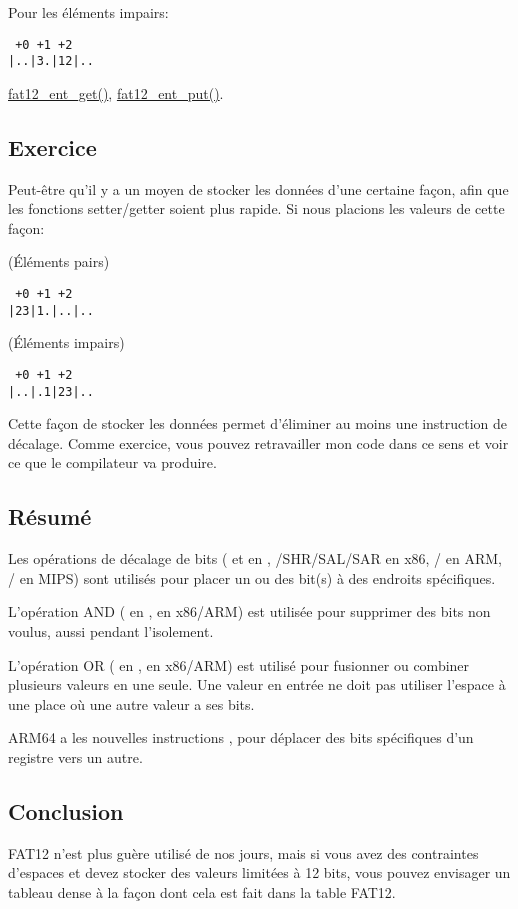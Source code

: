 Pour les éléments impairs:

\begin{lstlisting}
 +0 +1 +2
|..|3.|12|..
\end{lstlisting}

\href{https://github.com/torvalds/linux/blob/de182468d1bb726198abaab315820542425270b7/fs/fat/fatent.c#L117}{fat12\_ent\_get()},
\href{https://github.com/torvalds/linux/blob/de182468d1bb726198abaab315820542425270b7/fs/fat/fatent.c#L153}{fat12\_ent\_put()}.


\subsection{Exercice}

Peut-être qu'il y a un moyen de stocker les données d'une certaine façon, afin que
les fonctions setter/getter soient plus rapide.
Si nous placions les valeurs de cette façon:

(Éléments pairs)

\begin{lstlisting}
 +0 +1 +2
|23|1.|..|..
\end{lstlisting}

(Éléments impairs)

\begin{lstlisting}
 +0 +1 +2
|..|.1|23|..
\end{lstlisting}

Cette façon de stocker les données permet d'éliminer au moins une instruction de
décalage.
Comme exercice, vous pouvez retravailler mon code \CCpp dans ce sens et voir ce que
le compilateur va produire.

\subsection{Résumé}

Les opérations de décalage de bits (\TT{<<} et \TT{>>} en \CCpp, /{SHR}/{SAL}/{SAR}
en x86, / en ARM, / en MIPS) sont utilisés pour
placer un ou des bit(s) à des endroits spécifiques.

L'opération AND (\TT{\&} en \CCpp,  en x86/ARM) est utilisée pour supprimer
des bits non voulus, aussi pendant l'isolement.

L'opération OR (\TT{|} en \CCpp,  en x86/ARM) est utilisé pour fusionner
ou combiner plusieurs valeurs en une seule.
Une valeur en entrée ne doit pas utiliser l'espace à une place où une autre valeur
a ses bits.

ARM64 a les nouvelles instructions ,  pour déplacer des bits
spécifiques d'un registre vers un autre.

\subsection{Conclusion}

FAT12 n'est plus guère utilisé de nos jours, mais si vous avez des contraintes d'espaces
et devez stocker des valeurs limitées à 12 bits, vous pouvez envisager un tableau
dense à la façon dont cela est fait dans la table FAT12.


